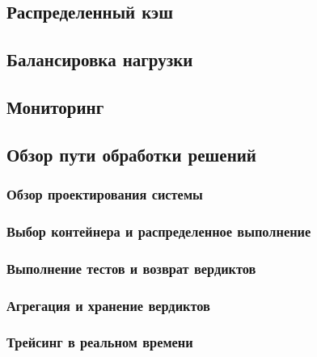 \subsection{Распределенный кэш}

\subsection{Балансировка нагрузки}

\subsection{Мониторинг}



\subsection{Обзор пути обработки решений}

\subsubsection{Обзор проектирования системы}

\subsubsection{Выбор контейнера и распределенное выполнение}

\subsubsection{Выполнение тестов и возврат вердиктов}

\subsubsection{Агрегация и хранение вердиктов}

\subsubsection{Трейсинг в реальном времени}

